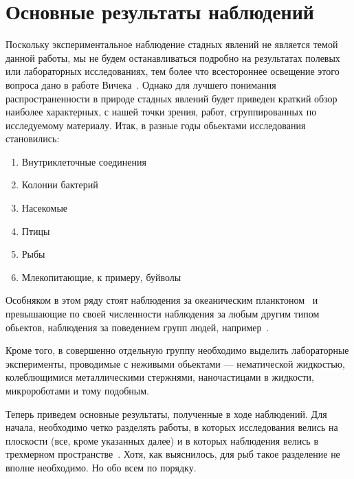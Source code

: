 \section{Основные результаты наблюдений} %
\label{sec:ObservationResults}
	Поскольку экспериментальное наблюдение стадных явлений не является темой данной работы, мы не будем останавливаться подробно на результатах полевых или лабораторных исследованиях, тем более что всестороннее освещение этого вопроса дано в работе Вичека~\cite{vicsek2012}. Однако для лучшего понимания распространенности в природе стадных явлений будет приведен краткий обзор наиболее характерных, с нашей точки зрения, работ, сгруппированных по исследуемому материалу. Итак, в разные годы обьектами исследования становились:
	\begin{enumerate}
		\item Внутриклеточные соединения~\cite{chowdhury2006,keller1971}
		\item Колонии бактерий~\cite{czirok1998,csahok1997}
		\item Насекомые~\cite{buhl2006}
		\item Птицы~\cite{ballerini2008,selous1931,dellariccia2008,biro2006,major1978,nagy2010}
		\item Рыбы~\cite{cambui2012,makris2009,parrish1997}
		\item Млекопитающие, к примеру, буйволы~\cite{sinclair1977}
	\end{enumerate}
	Особняком в этом ряду стоят наблюдения за океаническим планктоном~\cite{seuront2004} и превышающие по своей численности наблюдения за любым другим типом обьектов, наблюдения за поведением групп людей, например~\cite{parisi2009,moussaid2011}.

	Кроме того, в совершенно отдельную группу необходимо выделить лабораторные эксперименты, проводимые с неживыми обьектами --- нематической жидкостью, колеблющимися металлическими стержнями, наночастицами в жидкости, микророботами и тому подобным.~\cite{schaller2010,turgut2008,blair2003}

	Теперь приведем основные результаты, полученные в ходе наблюдений. Для начала, необходимо четко разделять работы, в которых исследования велись на плоскости (все, кроме указанных далее) и в которых наблюдения велись в трехмерном пространстве~\cite{cullen1965,ballerini2008,major1978,makris2009}. Хотя, как выяснилось, для рыб такое разделение не вполне необходимо. Но обо всем по порядку.

